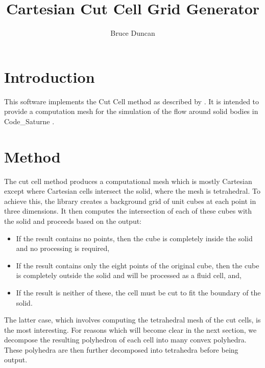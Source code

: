 \documentclass[a4paper,10pt]{article}
\title{Cartesian Cut Cell Grid Generator}
\author{Bruce Duncan}
\begin{document}
\maketitle

\section{Introduction}

This software implements the Cut Cell method as described by \cite{dingram}. It
is intended to provide a computation mesh for the simulation of the flow around
solid bodies in Code\_Saturne \cite{code_saturne}.

\section{Method}

The cut cell method produces a computational mesh which is mostly Cartesian
except where Cartesian cells intersect the solid, where the mesh is
tetrahedral. To achieve this, the library creates a background grid of unit
cubes at each point in three dimensions. It then computes the intersection of
each of these cubes with the solid and proceeds based on the output:
\begin{itemize}
 \item If the result contains no points, then the cube is completely inside the
solid and no processing is required,
\item If the result contains only the eight points of the original cube, then
the cube is completely outside the solid and will be processed as a fluid cell,
and,
\item If the result is neither of these, the cell must be cut to fit the
boundary of the solid.
\end{itemize}

The latter case, which involves computing the tetrahedral mesh of the cut cells,
is the most interesting. For reasons which will become clear in the next
section, we decompose the resulting polyhedron of each cell into many convex
polyhedra. These polyhedra are then further decomposed into tetrahedra before
being output.
\end{document}
